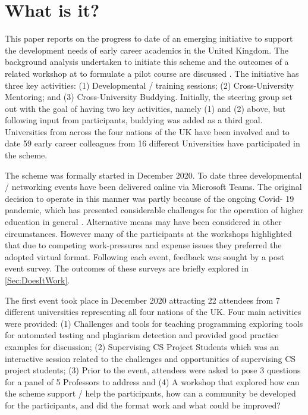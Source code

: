 \documentclass[sigconf]{acmart}
\begin{document}
\section{What is it?}	
\label{sec:What}
This paper reports on the progress to date of an emerging initiative to support the development needs of early career academics in the United Kingdom. The background analysis undertaken to initiate this scheme and the outcomes of a related workshop at  to formulate a pilot course are discussed . The initiative has three key activities: (1) Developmental / training sessions; (2) Cross-University Mentoring; and (3) Cross-University Buddying. Initially, the steering group set out with the goal of having two key activities, namely (1) and (2) above, but following input from participants, buddying was added as a third goal. Universities from across the four nations of the UK have been involved and to date 59 early career colleagues from 16 different Universities have participated in the scheme. 

The scheme was formally started in December 2020. To date three developmental / networking events have been delivered online via Microsoft Teams. The original decision to operate in this manner was partly because of the ongoing Covid- 19 pandemic, which has presented considerable challenges for the operation of higher education in general \cite{CrickCovidUK}. Alternative means may have been considered in other circumstances. However many of the participants at the workshops highlighted that due to competing work-pressures and expense issues they preferred the adopted virtual format. Following each event, feedback was sought by a post event survey. The outcomes of these surveys are briefly explored in \ref{Sec:DoesItWork}. 

The first event took place in December 2020 attracting 22 attendees from 7 different universities representing all four nations of the UK. Four main activities were provided: (1) Challenges and tools for teaching programming exploring tools for automated testing and plagiarism detection and provided good practice examples for discussion; (2) Supervising CS Project Students which was an interactive session related to the challenges and opportunities of supervising CS project students; (3) Prior to the event, attendees were asked to pose 3 questions for a panel of 5 Professors to address and (4) A workshop that explored how can the scheme support / help the participants, how can a community be developed for the participants, and did the format work and what could be improved?
\end{document}
